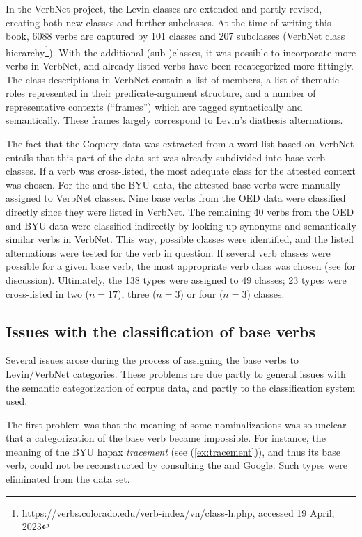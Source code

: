 In the VerbNet project, the Levin classes are extended and partly revised, creating both new classes and further subclasses. At the time of writing this book, 6088 verbs are captured by 101 classes and 207 subclasses (VerbNet class hierarchy\footnote{\url{https://verbs.colorado.edu/verb-index/vn/class-h.php}, accessed 19 April, 2023}).
With the additional \mbox{(sub-)}classes, it was possible to incorporate more verbs in VerbNet, and already listed verbs have been recategorized more fittingly. The class descriptions in VerbNet contain a list of members, a list of thematic roles represented in their predicate-argument structure, and a number of representative contexts (``frames'') which are tagged syntactically and semantically. These frames largely correspond to Levin's diathesis alternations.

The fact that the Coquery data was extracted from a word list based on VerbNet entails that this part of the data set was already subdivided into base verb classes. If a verb was cross-listed, the most adequate class for the attested context was chosen. 
For the  and the BYU data, the attested base verbs were manually assigned to VerbNet classes. Nine base verbs from the OED data were classified directly since they were listed in VerbNet. The remaining 40 verbs from the OED and BYU data were classified indirectly by looking up synonyms and semantically similar verbs in VerbNet. This way, possible classes were identified, and the listed alternations were tested for the verb in question. If several verb classes were possible for a given base verb, the most appropriate verb class was chosen (see  for discussion).
Ultimately, the 138 types were assigned to 49 classes; 23 types were cross-listed in two ($n=17$), three ($n=3$) or four ($n=3$) classes. 

\subsection{Issues with the classification of base verbs}
\label{sec:meth-Vsem-issues}
Several issues arose during the process of assigning the base verbs to Levin/VerbNet categories. These problems are due partly to general issues with the semantic categorization of corpus data, and partly to the classification system used. 

The first problem was that the meaning of some nominalizations was so unclear that a categorization of the base verb became impossible. For instance, the meaning of the BYU hapax \textit{tracement} (see (\ref{ex:tracement})), and thus its base verb, could not be reconstructed by consulting the  and Google. Such types were eliminated from the data set.\largerpage

